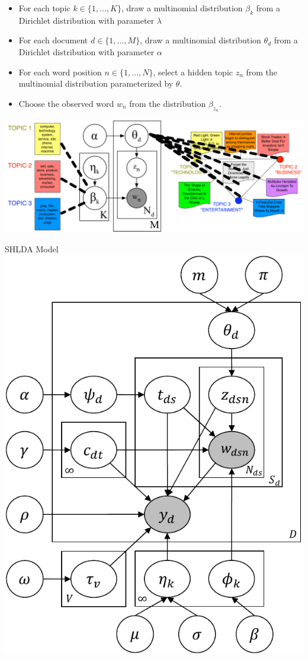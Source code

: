 \documentclass[compress]{beamer}
\begin{document}
{\begin{itemize}
\item<1-> For each topic $k \in \{1, \dots, K\}$, draw a multinomial distribution $\beta_k$ from a Dirichlet distribution with parameter $\lambda$
\item<2-> For each document $d \in \{1, \dots, M\}$, draw a multinomial distribution $\theta_d$ from a Dirichlet distribution with parameter $\alpha$
\item<3-> For each word position $n \in \{1, \dots, N\}$, select a hidden topic $z_n$ from the multinomial distribution parameterized by $\theta$.
\item<4-> Choose the observed word $w_n$ from the distribution $\beta_{z_n}$.
\end{itemize}

}

\begin{frame}

	\includegraphics[width=1.0\linewidth]{mrlda/lda_graphmod_nyt}

\end{frame}


\begin{frame}{SHLDA Model}
                    \centering
    \includegraphics[width=.5\linewidth]{shlda/shLDA}
\end{frame}
\end{document}
